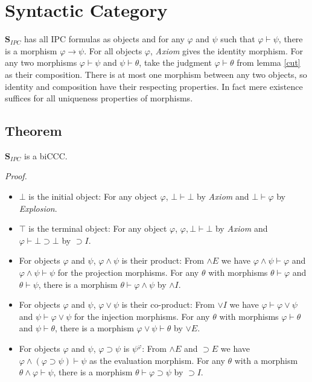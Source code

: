 \documentclass[a4paper,12pt]{paper}
\begin{document}
\section{Syntactic Category} $\mathbf{S}_{IPC}$ has all IPC formulas as objects and for any $\varphi$ and $\psi$ such that $\varphi \vdash \psi$, there is a morphism $\varphi \longrightarrow \psi$.
For all objects $\varphi$, \textit{Axiom} gives the identity morphism. For any two morphisms $\varphi \vdash \psi$ and $\psi \vdash \theta$, take the judgment $\varphi \vdash \theta$ from lemma \ref{cut} as their composition. There is at most one morphism between any two objects, so identity and composition have their respecting properties. In fact mere existence suffices for all uniqueness properties of morphisms.

\subsection{Theorem}\label{S_is_ccc} $\mathbf{S}_{IPC}$ is a biCCC.

\textit{Proof.}
\begin{itemize}
\item $\bot$ is the initial object: For any object $\varphi$, $\bot \vdash \bot$ by \textit{Axiom} and $\bot \vdash \varphi$ by \textit{Explosion}. \\
\item $\top$ is the terminal object: For any object $\varphi$, $\varphi,\bot \vdash \bot$ by \textit{Axiom} and $\varphi \vdash \bot \supset \bot$ by $\supset I$. \\
\item For objects $\varphi$ and $\psi$, $\varphi \land \psi$ is their product: From $\land E$ we have $\varphi \land \psi \vdash \varphi$ and $\varphi \land \psi \vdash \psi$ for the projection morphisms. For any $\theta$ with morphisms $\theta \vdash \varphi$ and $\theta \vdash \psi$, there is a morphism $\theta \vdash \varphi \land \psi$ by $\land I$. \\
\item For objects $\varphi$ and $\psi$, $\varphi \lor \psi$ is their co-product: From $\lor I$ we have $\varphi \vdash \varphi \lor \psi$ and $\psi \vdash \varphi \lor \psi$ for the injection morphisms. For any $\theta$ with morphisms $\varphi \vdash \theta$ and $\psi \vdash \theta$, there is a morphism $\varphi \lor \psi \vdash \theta$ by $\lor E$. \\
\item For objects $\varphi$ and $\psi$, $\varphi \supset \psi$ is $\psi^\varphi$: From $\land E$ and $\supset E$ we have $\varphi \land (\varphi \supset \psi) \vdash \psi$ as the evaluation morphism. For any $\theta$ with a morphism $\theta \land \varphi \vdash \psi$, there is a morphism $\theta \vdash \varphi \supset \psi$ by $\supset I$.
\end{itemize}
\end{document}
